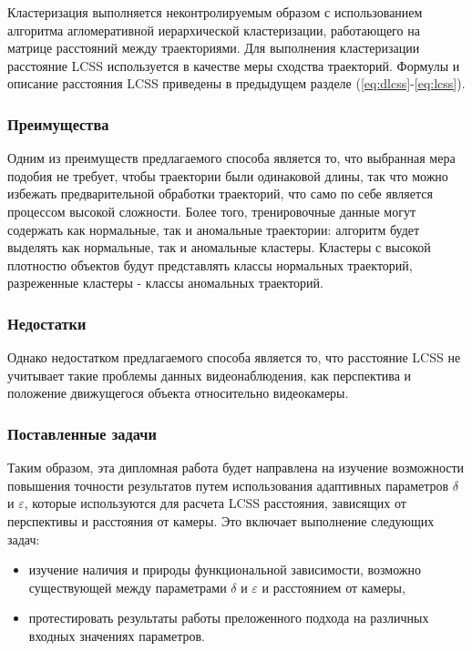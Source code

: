 Кластеризация выполняется неконтролируемым образом с использованием алгоритма агломеративной иерархической кластеризации, работающего на матрице расстояний между траекториями. Для выполнения кластеризации расстояние LCSS используется в качестве меры сходства траекторий. Формулы и описание расстояния LCSS приведены в предыдущем разделе (\ref{eq:dlcss}-\ref{eq:lcss}).

\subsubsection{Преимущества}

Одним из преимуществ предлагаемого способа является то, что выбранная мера подобия не требует, чтобы траектории были одинаковой длины, так что можно избежать предварительной обработки траекторий, что само по себе является процессом высокой сложности. Более того, тренировочные данные могут содержать как нормальные, так и аномальные траектории: алгоритм будет выделять как нормальные, так и аномальные кластеры. Кластеры с высокой плотностю объектов будут представлять классы нормальных траекторий, разреженные кластеры - классы аномальных траекторий.

\subsubsection{Недостатки}

Однако недостатком предлагаемого способа является то, что расстояние LCSS не учитывает такие проблемы данных видеонаблюдения, как перспектива и положение движущегося объекта относительно видеокамеры.

\subsubsection{Поставленные задачи}

Таким образом, эта дипломная работа будет направлена на изучение возможности повышения точности результатов путем использования адаптивных параметров $\delta$ и $\varepsilon$, которые используются для расчета LCSS расстояния, зависящих от перспективы и расстояния от камеры. Это включает выполнение следующих задач:

\begin{itemize}
	\setlength\itemsep{-0.5em}
	\item изучение наличия и природы функциональной зависимости, возможно существующей между параметрами $\delta$ и $\varepsilon$ и расстоянием от камеры,
	\item протестировать результаты работы преложенного подхода на различных входных значениях параметров.
\end{itemize}